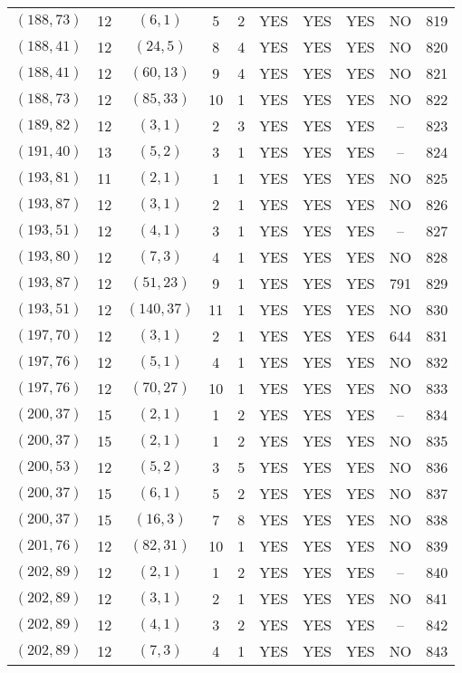 \begin{longtable}{|c|c|c|c|c|c|c|c|c|c|}
$(188, 73)$ & 12 & $(6, 1)$ & 5 & 2 & YES & YES & YES & NO & 819\\
$(188, 41)$ & 12 & $(24, 5)$ & 8 & 4 & YES & YES & YES & NO & 820\\
$(188, 41)$ & 12 & $(60, 13)$ & 9 & 4 & YES & YES & YES & NO & 821\\
$(188, 73)$ & 12 & $(85, 33)$ & 10 & 1 & YES & YES & YES & NO & 822\\
$(189, 82)$ & 12 & $(3, 1)$ & 2 & 3 & YES & YES & YES & -- & 823\\
$(191, 40)$ & 13 & $(5, 2)$ & 3 & 1 & YES & YES & YES & -- & 824\\
$(193, 81)$ & 11 & $(2, 1)$ & 1 & 1 & YES & YES & YES & NO & 825\\
$(193, 87)$ & 12 & $(3, 1)$ & 2 & 1 & YES & YES & YES & NO & 826\\
$(193, 51)$ & 12 & $(4, 1)$ & 3 & 1 & YES & YES & YES & -- & 827\\
$(193, 80)$ & 12 & $(7, 3)$ & 4 & 1 & YES & YES & YES & NO & 828\\
$(193, 87)$ & 12 & $(51, 23)$ & 9 & 1 & YES & YES & YES & 791 & 829\\
$(193, 51)$ & 12 & $(140, 37)$ & 11 & 1 & YES & YES & YES & NO & 830\\
$(197, 70)$ & 12 & $(3, 1)$ & 2 & 1 & YES & YES & YES & 644 & 831\\
$(197, 76)$ & 12 & $(5, 1)$ & 4 & 1 & YES & YES & YES & NO & 832\\
$(197, 76)$ & 12 & $(70, 27)$ & 10 & 1 & YES & YES & YES & NO & 833\\
$(200, 37)$ & 15 & $(2, 1)$ & 1 & 2 & YES & YES & YES & -- & 834\\
$(200, 37)$ & 15 & $(2, 1)$ & 1 & 2 & YES & YES & YES & NO & 835\\
$(200, 53)$ & 12 & $(5, 2)$ & 3 & 5 & YES & YES & YES & NO & 836\\
$(200, 37)$ & 15 & $(6, 1)$ & 5 & 2 & YES & YES & YES & NO & 837\\
$(200, 37)$ & 15 & $(16, 3)$ & 7 & 8 & YES & YES & YES & NO & 838\\
$(201, 76)$ & 12 & $(82, 31)$ & 10 & 1 & YES & YES & YES & NO & 839\\
$(202, 89)$ & 12 & $(2, 1)$ & 1 & 2 & YES & YES & YES & -- & 840\\
$(202, 89)$ & 12 & $(3, 1)$ & 2 & 1 & YES & YES & YES & NO & 841\\
$(202, 89)$ & 12 & $(4, 1)$ & 3 & 2 & YES & YES & YES & -- & 842\\
$(202, 89)$ & 12 & $(7, 3)$ & 4 & 1 & YES & YES & YES & NO & 843\\

\end{longtable}
